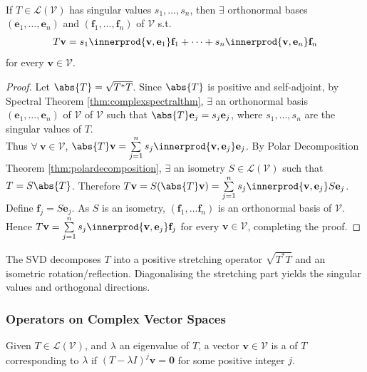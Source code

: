\begin{theorem} \label{thm:singularvaluedecomposition} \\
If $T \in \mathcal{L}(\mathcal{V})$ has singular values $s_1, \ldots, s_n$, then $\exists$ orthonormal bases $(\mathbf{e}_1, \ldots, \mathbf{e}_n)$ and $(\mathbf{f}_1, \ldots, \mathbf{f}_n)$ of $\mathcal{V}$ s.t.
\begin{align}
T \mathbf{v} = s_1 \innerprod{\mathbf{v}, \mathbf{e}_1} \mathbf{f}_1 + \cdots + s_n \innerprod{\mathbf{v}, \mathbf{e}_n} \mathbf{f}_n \nonumber
\end{align}
for every $\mathbf{v} \in \mathcal{V}$.
\begin{proof} Let $\abs{T} = \sqrt{T^* T}$. Since $\abs{T}$ is positive and self-adjoint, by Spectral Theorem \ref{thm:complexspectralthm}, $\exists$ an orthonormal basis $(\mathbf{e}_1, \ldots, \mathbf{e}_n)$ of $\mathcal{V}$ of $\mathcal{V}$ such that $\abs{T} \mathbf{e}_j = s_j \mathbf{e}_j$, where $s_1, \ldots, s_n$ are the singular values of $T$.\\
Thus $\forall \ \mathbf{v} \in \mathcal{V}$, $\abs{T} \mathbf{v} = \sum\limits_{j=1}^n s_j \innerprod{\mathbf{v}, \mathbf{e}_j} \mathbf{e}_j$. By Polar Decomposition Theorem \ref{thm:polardecomposition}, $\exists$ an isometry  $S \in \mathcal{L}(\mathcal{V})$ such that $T = S \abs{T}$. Therefore $T \mathbf{v} = S(\abs{T} \mathbf{v}) = \sum\limits_{j=1}^n s_j \innerprod{\mathbf{v}, \mathbf{e}_j} S \mathbf{e}_j$.\\
Define $\mathbf{f}_j = S \mathbf{e}_j$. As $S$ is an isometry, $(\mathbf{f}_1, \ldots \mathbf{f}_n)$ is an orthonormal basis of $\mathcal{V}$. Hence $T \mathbf{v} = \sum\limits_{j=1}^n s_j \innerprod{\mathbf{v}, \mathbf{e}_j} \mathbf{f}_j$ for every $\mathbf{v} \in \mathcal{V}$, completing the proof.
\end{proof}
\end{theorem}

The SVD decomposes $T$ into a positive stretching operator $\sqrt{T^*T}$ and an isometric rotation/reflection. Diagonalising the stretching part yields the singular values and orthogonal directions.

\subsubsection{Operators on Complex Vector Spaces}

\begin{definition} Given $T \in \mathcal{L}(\mathcal{V})$, and $\lambda$ an eigenvalue of $T$, a vector $\mathbf{v} \in \mathcal{V}$ is a  of $T$ corresponding to $\lambda$ if $(T - \lambda I)^j \mathbf{v} = \mathbf{0}$ for some positive integer $j$.
\end{definition}

